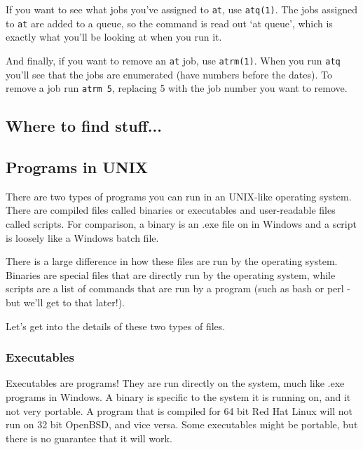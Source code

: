 If you want to see what jobs you've assigned to {\tt at}, use {\tt atq(1)}.
The jobs assigned to {\tt at} are added to a queue, so the command is 
read out `at queue', which is exactly what you'll be looking at when you 
run it.

And finally, if you want to remove an {\tt at} job, use {\tt atrm(1)}.
When you run {\tt atq} you'll see that the jobs are enumerated (have numbers before 
the dates). To remove a job run {\tt atrm 5}, replacing 5 with the job number you want to remove.
			
\subsection {Where to find stuff...} 
		

\subsection {Programs in UNIX}


	There are two types of programs you can run in an UNIX-like operating system.
	There are compiled files called binaries or executables and user-readable 
	files called scripts. For comparison, a binary is an .exe file on in Windows and a script 
	is loosely like a Windows batch file.

	There is a large difference in how these files are run by the operating system.
	Binaries are special files that are directly run by the operating system, while
	scripts are a list of commands that are run by a program (such as bash or 
	perl - but we'll get to that later!).

	Let's get into the details of these two types of files.


\subsubsection {Executables} 

	
	Executables are programs! They are run directly on the system, much like .exe programs
	in Windows. A binary is specific to the system it is running on, and it not very portable.
	A program that is compiled for 64 bit Red Hat Linux will not run on 32 bit OpenBSD, and vice versa.
	Some executables might be portable, but there is no guarantee that it will work. 
	
